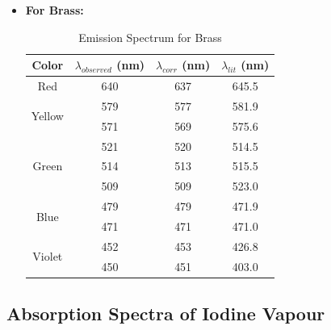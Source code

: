 \begin{itemize}
    \item \textbf{For Brass:}
    \begin{table}[H]
        \centering
        \begin{tabular}{|c|c|c|c|}
            \hline
            Color                   & $\lambda_{observed}$   (nm) & $\lambda_{corr}$   (nm) & $\lambda_{lit}$   (nm) \\ \hline
            Red                     & 640                         & 637                     & 645.5                  \\ \hline
            \multirow{2}{*}{Yellow} & 579                         & 577                     & 581.9                  \\ \cline{2-4} 
                                    & 571                         & 569                     & 575.6                  \\ \hline
            \multirow{3}{*}{Green}  & 521                         & 520                     & 514.5                  \\ \cline{2-4} 
                                    & 514                         & 513                     & 515.5                  \\ \cline{2-4} 
                                    & 509                         & 509                     & 523.0                  \\ \hline
            \multirow{2}{*}{Blue}   & 479                         & 479                     & 471.9                  \\ \cline{2-4} 
                                    & 471                         & 471                     & 471.0                  \\ \hline
            \multirow{2}{*}{Violet} & 452                         & 453                     & 426.8                  \\ \cline{2-4} 
                                    & 450                         & 451                     & 403.0                  \\ \hline
        \end{tabular}
        \caption{Emission Spectrum for Brass}
        \label{tab:brass}
        \end{table}
\end{itemize}

\subsection*{Absorption Spectra of Iodine Vapour}

